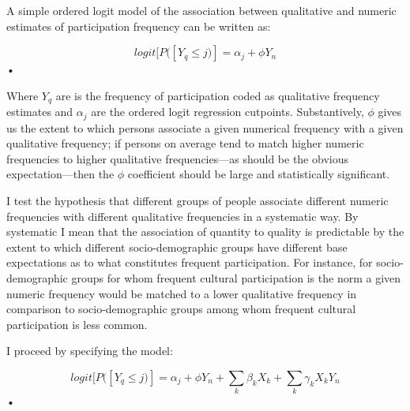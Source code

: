 \documentclass[11pt]{article}
\begin{document}
A simple ordered logit model of the association between qualitative and numeric estimates of participation frequency can be written as:

\begin{equation}
	logit[P([Y_q \leq j)]=\alpha_j + \phi Y_n	
	 \label{eq:equation1}
\end{equation}•

Where $Y_q$ are is the frequency of participation coded as qualitative frequency estimates and $\alpha_j$ are the ordered logit regression cutpoints.  Substantively, $\phi$ gives us the extent to which persons associate a given numerical frequency with a given qualitative frequency; if persons on average tend to match higher numeric frequencies to higher qualitative frequencies---as should be the obvious expectation---then the $\phi$ coefficient should be large and statistically significant.   

I test the hypothesis that different groups of people associate different numeric frequencies with different qualitative frequencies in a systematic way.  By systematic I mean that the association of quantity to quality is predictable by the extent to which different socio-demographic groups have different base expectations as to what constitutes frequent participation.  For instance, for socio-demographic groups for whom frequent cultural participation is the norm a given numeric frequency would be matched to a lower qualitative frequency in comparison to socio-demographic groups among whom frequent cultural participation is less common.  

I proceed by specifying the model:

\begin{equation}
	logit[P([Y_q \leq j)]=\alpha_j + \phi Y_n	+ \sum_k \beta_k X_k + \sum_k \gamma_k X_kY_n
	 \label{eq:equation2}
\end{equation}•
\end{document}
